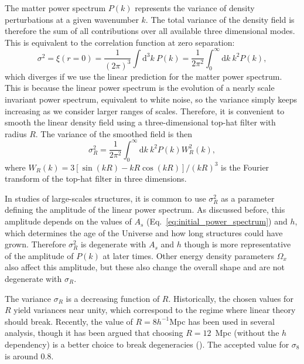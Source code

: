     The matter power spectrum $P(k)$ represents the variance of density perturbations 
    at a given wavenumber $k$. The total variance of the density field is therefore 
    the sum of all contributions over all available three dimensional modes. 
    This is equivalent to the correlation function at zero separation:
    \begin{equation}
        \sigma^2 = \xi(r=0) = \frac{1}{(2\pi)^3}\int \mathrm{d}^3k ~ P(k) = \frac{1}{2\pi^2} \int_0^\infty \mathrm{d}k ~k^2 P(k), 
        \label{eq:variance_linear_field}
    \end{equation} 
    which diverges if we use the linear prediction for the matter power spectrum.
    This is because the linear power spectrum is the evolution of a nearly scale 
    invariant power spectrum, equivalent to white noise, so the variance simply 
    keeps increasing as we consider larger ranges of scales. Therefore, it is 
    convenient to smooth the linear density field using a three-dimensional 
    top-hat filter with radius $R$. The variance of the smoothed field is 
    then 
    \begin{equation}
        \sigma_R^2 = \frac{1}{2\pi^2} \int_0^\infty \mathrm{d}k ~k^2 P(k) W_R^2(k),
        \label{eq:variance_linear_field_smoothed}
    \end{equation}
    where $W_R(k) = 3[\sin(kR) - kR \cos(kR)]/(kR)^3$ is the Fourier transform of the
    top-hat filter in three dimensions. 

    In studies of large-scales structures, it is common to use $\sigma_R^2$ 
    as a parameter defining the amplitude of the linear power spectrum. 
    As discussed before, this amplitude depends on the values of $A_s$ (Eq.~\ref{eq:initial_power_spectrum})
    and $h$, which determines the age of the Universe and how long structures could have grown.
    Therefore $\sigma_R^2$ is degenerate with $A_s$ and $h$ though is more representative of
    the amplitude of $P(k)$ at later times.  
    Other energy density parameters $\Omega_x$ also affect this amplitude, but these
    also change the overall shape and are not degenerate with $\sigma_R$. 

    The variance $\sigma_R$ is a decreasing function of $R$. Historically, 
    the chosen values for $R$ yield variances near unity, which correspond to 
    the regime where linear theory should break.   
    Recently, the value of $R = 8h^{-1}$Mpc has been used in several analysis, 
    though it has been argued that choosing $R = 12$~Mpc (without the $h$ dependency)
    is a better choice to break degeneracies (\cite{sanchezArgumentsUsingMpc2020}).
    The accepted value for $\sigma_8$ is around 0.8. 

